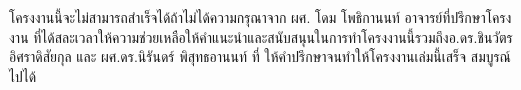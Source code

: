 \iffalse
\begin{dedication}
This document is dedicated to all Chiang Mai University students.

Dedication page is optional.
\end{dedication}
\fi %

\begin{acknowledgments}
 \hspace{1.27cm}โครงงานนี้จะไม่สามารถสำเร็จได้ถ้าไม่ได้ความกรุณาจาก ผศ. โดม โพธิกานนท์ อาจารย์ที่ปรึกษาโครงงาน ที่ได้สละเวลาให้ความช่วยเหลือให้คำแนะนำและสนับสนุนในการทำโครงงานนี้รวมถึงอ.ดร.ชินวัตร อิศราดิสัยกุล  และ ผศ.ดร.นิรันดร์ พิสุทธอานนท์ ที่ ให้คำปรึกษาจนทำให้โครงงานเล่มนี้เสร็จ
สมบูรณ์ไปได้


\end{acknowledgments}%
\fi %

\contentspage

\ifproject
\figurelistpage

\tablelistpage
\fi %



